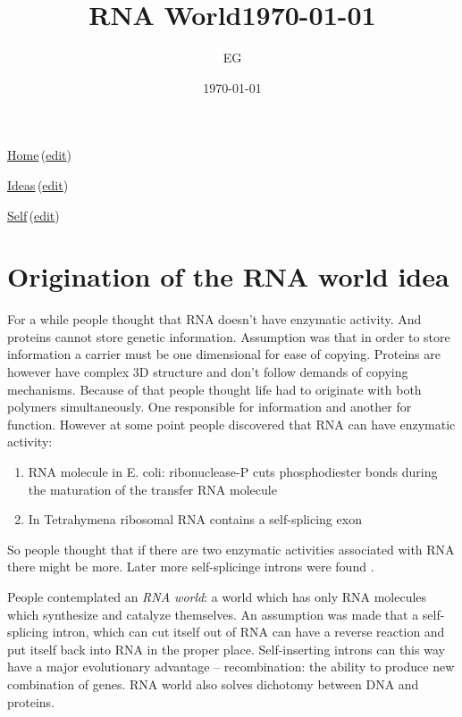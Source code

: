 \documentclass[12pt]{paper}
\title{RNA World\today}
\author{EG}
\date{\today}
\newcommand{\wikilink}[2] { \href{#1.pdf}{#2}\,(\href{#1.tex}{edit})}
\begin{document}
 \maketitle
\wikilink{home}{Home}

\wikilink{ideas}{Ideas}

\wikilink{rna_world}{Self}

\tableofcontents

\section{Origination of the RNA world idea}

For a while people thought that RNA doesn't have enzymatic activity. And proteins cannot store 
genetic information. Assumption was that in order to store information a carrier must be one 
dimensional for ease of copying. Proteins are however have complex 3D structure and don't follow 
demands of copying mechanisms. 
 Because of that people thought life had to originate with both polymers 
simultaneously. One responsible for information and another for function. However at some point 
people discovered that RNA can have enzymatic activity:\
\begin{enumerate}
 \item RNA molecule in E. coli: ribonuclease-P cuts phosphodiester bonds during the maturation of 
the transfer RNA molecule\cite{Guerrier-Takada1983,Guerrier-Takada1984}
\item In Tetrahymena ribosomal RNA contains a self-splicing exon \cite{Cech1981,Kruger1982}
\end{enumerate}
So people thought that if there are two enzymatic activities associated with RNA there might be 
more. Later more self-splicinge introns were found \cite{Cech1986}.

People contemplated an \textit{RNA world}: a world which has only RNA molecules which synthesize 
and catalyze themselves. An assumption was made that a self-splicing intron, which can cut itself 
out of RNA can have a reverse reaction and put itself back into RNA in the proper place. 
Self-inserting introns can this way have a major evolutionary advantage -- recombination: the 
ability to produce new combination of genes. RNA world also solves dichotomy between DNA and 
proteins. 
\end{document}
